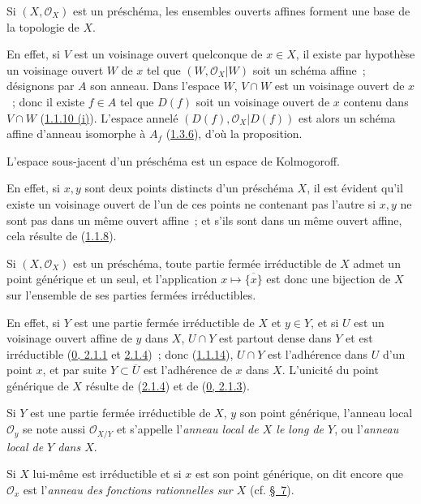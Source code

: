 
\begin{proposition}[2.1.3]
\label{I.2.1.3-fr}
Si $(X,\mathscr{O}_X)$ est un préschéma, les ensembles ouverts affines forment
une base de la topologie de $X$.
\end{proposition}

En effet, si $V$ est un voisinage ouvert quelconque de $x\in X$, il existe par
hypothèse un voisinage ouvert $W$ de $x$ tel que
$(W,\mathscr{O}_X|W)$ soit un schéma affine~; désignons par $A$ son anneau.
Dans l'espace $W$, $V\cap W$ est un voisinage ouvert de $x$~; donc il existe
$f\in A$ tel que $D(f)$ soit un voisinage ouvert de $x$ contenu dans
$V\cap W$ (\hyperref[I.1.1.10-fr]{1.1.10 (i)}). L'espace annelé
$(D(f),\mathscr{O}_X|D(f))$ est alors un schéma affine d'anneau isomorphe à
$A_f$ (\hyperref[I.1.3.6-fr]{1.3.6}), d'où la proposition.

\begin{proposition}[2.1.4]
\label{I.2.1.4-fr}
L'espace sous-jacent d'un préschéma est un espace de Kolmogoroff.
\end{proposition}

En effet, si $x,y$ sont deux points distincts d'un préschéma $X$, il est
évident qu'il existe un voisinage ouvert de l'un de ces points ne contenant
pas l'autre si $x,y$ ne sont pas dans un même ouvert affine~; et s'ils sont
dans un même ouvert affine, cela résulte de
(\hyperref[I.1.1.8-fr]{1.1.8}).

\begin{proposition}[2.1.5]
\label{I.2.1.5-fr}
Si $(X,\mathscr{O}_X)$ est un préschéma, toute partie fermée irréductible de
$X$ admet un point générique et un seul, et l'application
$x\longmapsto\overline{\{x\}}$ est donc une bijection de $X$ sur l'ensemble
de ses parties fermées irréductibles.
\end{proposition}

En effet, si $Y$ est une partie fermée irréductible de $X$ et $y\in Y$, et si
$U$ est un voisinage ouvert affine de $y$ dans $X$, $U\cap Y$ est partout
dense dans $Y$ et est irréductible
(\hyperref[0.2.1.1-fr]{0, 2.1.1} et
\hyperref[0.2.1.4-fr]{2.1.4})~; donc
(\hyperref[I.1.1.14-fr]{1.1.14}), $U\cap Y$ est l'adhérence dans $U$ d'un
point $x$, et par suite $Y\subset\overline{U}$ est l'adhérence de $x$ dans
$X$. L'unicité du point générique de $X$ résulte de
(\hyperref[I.2.1.4-fr]{2.1.4}) et de
(\hyperref[0.2.1.3-fr]{0, 2.1.3}).

\begin{env}[2.1.6]
\label{I.2.1.6-fr}
Si $Y$ est une partie fermée irréductible de $X$, $y$ son point générique,
l'anneau local $\mathscr{O}_y$ se note aussi $\mathscr{O}_{X/Y}$ et s'appelle
l'\emph{anneau local de $X$ le long de $Y$}, ou l'\emph{anneau local de $Y$
dans $X$}.

Si $X$ lui-même est irréductible et si $x$ est son point générique, on dit
encore que $\mathscr{O}_x$ est l'\emph{anneau des fonctions rationnelles sur
$X$} (cf. \hyperref[section:I.7-fr]{§~7}).
\end{env}

